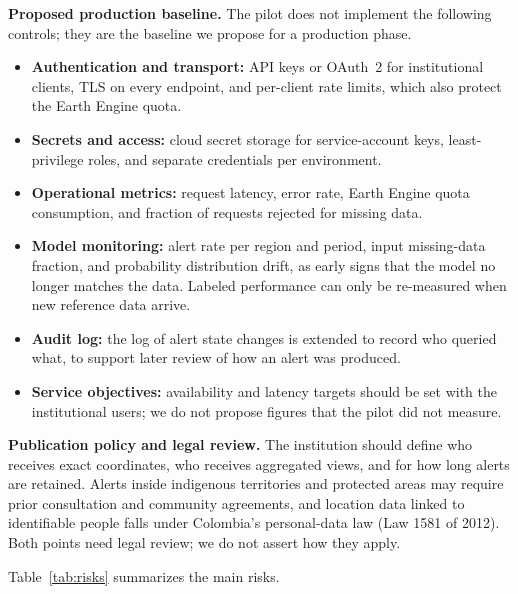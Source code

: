 \documentclass{article}
\begin{document}
\textbf{Proposed production baseline.} The pilot does not implement the
following controls; they are the baseline we propose for a production phase.
\begin{itemize}
    \item \textbf{Authentication and transport:} API keys or OAuth~2 for
    institutional clients, TLS on every endpoint, and per-client rate limits,
    which also protect the Earth Engine quota.
    \item \textbf{Secrets and access:} cloud secret storage for service-account
    keys, least-privilege roles, and separate credentials per environment.
    \item \textbf{Operational metrics:} request latency, error rate, Earth
    Engine quota consumption, and fraction of requests rejected for missing data.
    \item \textbf{Model monitoring:} alert rate per region and period, input
    missing-data fraction, and probability distribution drift, as early signs
    that the model no longer matches the data. Labeled performance can only be
    re-measured when new reference data arrive.
    \item \textbf{Audit log:} the log of alert state changes is extended to
    record who queried what, to support later review of how an alert was
    produced.
    \item \textbf{Service objectives:} availability and latency targets should be
    set with the institutional users; we do not propose figures that the pilot
    did not measure.
\end{itemize}

\textbf{Publication policy and legal review.} The institution should define who
receives exact coordinates, who receives aggregated views, and for how long
alerts are retained. Alerts inside indigenous territories and protected areas
may require prior consultation and community agreements, and location data
linked to identifiable people falls under Colombia's personal-data law (Law 1581
of 2012). Both points need legal review; we do not assert how they apply.

Table~\ref{tab:risks} summarizes the main risks.
\end{document}
